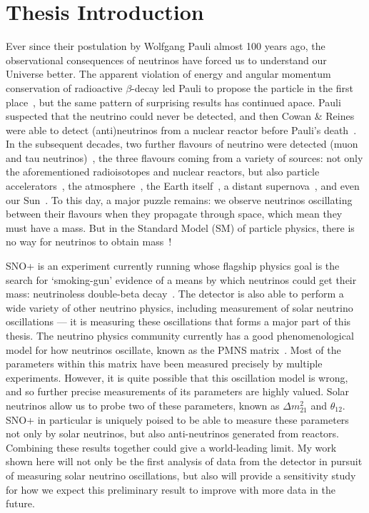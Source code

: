 \section{Thesis Introduction}\label{sect:Introduction}

Ever since their postulation by Wolfgang Pauli almost 100 years ago, the observational consequences of neutrinos have forced us to understand our Universe better. The apparent violation of energy and angular momentum conservation of radioactive $\beta$-decay led Pauli to propose the particle in the first place~\cite{noauthor_rapports_1935}, but the same pattern of surprising results has continued apace. Pauli suspected that the neutrino could never be detected, and then Cowan \& Reines were able to detect (anti)neutrinos from a nuclear reactor before Pauli's death~\cite{reines_neutrino_1956,cowan_detection_1956}. In the subsequent decades, two further flavours of neutrino were detected (muon and tau neutrinos)~\cite{danby_observation_1962,kodama_observation_2001}, the three flavours coming from a variety of sources: not only the aforementioned radioisotopes and nuclear reactors, but also particle accelerators~\cite{danby_observation_1962}, the atmosphere~\cite{abe_atmospheric_2018}, the Earth itself~\cite{agostini_comprehensive_2020}, a distant supernova~\cite{hirata_observation_1987}, and even our Sun~\cite{cleveland_measurement_1998}. To this day, a major puzzle remains: we observe neutrinos oscillating between their flavours when they propagate through space, which mean they must have a mass. But in the Standard Model (SM) of particle physics, there is no way for neutrinos to obtain mass~\cite{particle_data_group_review_2020}!

SNO+ is an experiment currently running whose flagship physics goal is the search for `smoking-gun' evidence of a means by which neutrinos could get their mass: neutrinoless double-beta decay~\cite{albanese_sno_2021}. The detector is also able to perform a wide variety of other neutrino physics, including measurement of solar neutrino oscillations --- it is measuring these oscillations that forms a major part of this thesis. The neutrino physics community currently has a good phenomenological model for how neutrinos oscillate, known as the PMNS matrix~\cite{particle_data_group_review_2020}. Most of the parameters within this matrix have been measured precisely by multiple experiments. However, it is quite possible that this oscillation model is wrong, and so further precise measurements of its parameters are highly valued. Solar neutrinos allow us to probe two of these parameters, known as $\Delta m^{2}_{21}$ and $\theta_{12}$. SNO+ in particular is uniquely poised to be able to measure these parameters not only by solar neutrinos, but also anti-neutrinos generated from reactors. Combining these results together could give a world-leading limit. My work shown here will not only be the first analysis of data from the detector in pursuit of measuring solar neutrino oscillations, but also will provide a sensitivity study for how we expect this preliminary result to improve with more data in the future.

